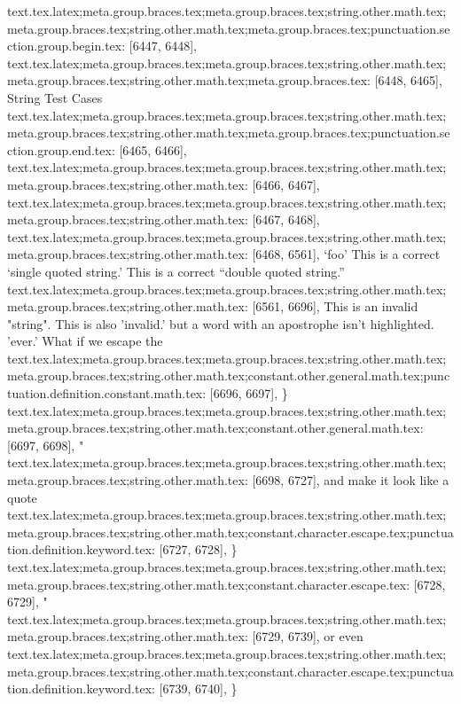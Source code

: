 {{{{{{{{{{{{{{{{{{{{{{{{{{{{{{{{{{{{{{{{{{{{{{{{{{{{{{{{{{{{{{{{{{{{{{{{{{{{{{{{{{{{{{{{{{{{{{{{{{{{{{{{{{{{{{{{{{{{{{{{{{{{{{{{{{{{{{{{{{{{{{{{{{{{{{{{{{{{{{{{{{{{{{{{{{{{{{{{{{{{{text.tex.latex;meta.group.braces.tex;meta.group.braces.tex;string.other.math.tex;meta.group.braces.tex;string.other.math.tex;meta.group.braces.tex;punctuation.section.group.begin.tex: [6447, 6448], {{}
text.tex.latex;meta.group.braces.tex;meta.group.braces.tex;string.other.math.tex;meta.group.braces.tex;string.other.math.tex;meta.group.braces.tex: [6448, 6465], {String Test Cases}
text.tex.latex;meta.group.braces.tex;meta.group.braces.tex;string.other.math.tex;meta.group.braces.tex;string.other.math.tex;meta.group.braces.tex;punctuation.section.group.end.tex: [6465, 6466], {}}
text.tex.latex;meta.group.braces.tex;meta.group.braces.tex;string.other.math.tex;meta.group.braces.tex;string.other.math.tex: [6466, 6467], {
}
text.tex.latex;meta.group.braces.tex;meta.group.braces.tex;string.other.math.tex;meta.group.braces.tex;string.other.math.tex: [6467, 6468], {
}
text.tex.latex;meta.group.braces.tex;meta.group.braces.tex;string.other.math.tex;meta.group.braces.tex;string.other.math.tex: [6468, 6561], {`foo' This is a correct `single quoted string.'  This is a correct ``double quoted string.''
}
text.tex.latex;meta.group.braces.tex;meta.group.braces.tex;string.other.math.tex;meta.group.braces.tex;string.other.math.tex: [6561, 6696], {This is an invalid "string".  This is also 'invalid.'  but a word with an apostrophe isn't highlighted. 'ever.'  What if we escape the }
text.tex.latex;meta.group.braces.tex;meta.group.braces.tex;string.other.math.tex;meta.group.braces.tex;string.other.math.tex;constant.other.general.math.tex;punctuation.definition.constant.math.tex: [6696, 6697], {\}
text.tex.latex;meta.group.braces.tex;meta.group.braces.tex;string.other.math.tex;meta.group.braces.tex;string.other.math.tex;constant.other.general.math.tex: [6697, 6698], {"}
text.tex.latex;meta.group.braces.tex;meta.group.braces.tex;string.other.math.tex;meta.group.braces.tex;string.other.math.tex: [6698, 6727], {and make it look like a quote}
text.tex.latex;meta.group.braces.tex;meta.group.braces.tex;string.other.math.tex;meta.group.braces.tex;string.other.math.tex;constant.character.escape.tex;punctuation.definition.keyword.tex: [6727, 6728], {\}
text.tex.latex;meta.group.braces.tex;meta.group.braces.tex;string.other.math.tex;meta.group.braces.tex;string.other.math.tex;constant.character.escape.tex: [6728, 6729], {"}
text.tex.latex;meta.group.braces.tex;meta.group.braces.tex;string.other.math.tex;meta.group.braces.tex;string.other.math.tex: [6729, 6739], {  or even }
text.tex.latex;meta.group.braces.tex;meta.group.braces.tex;string.other.math.tex;meta.group.braces.tex;string.other.math.tex;constant.character.escape.tex;punctuation.definition.keyword.tex: [6739, 6740], {\}
}}}}}}}}}}}}}}}}}}}}}}}}}}}}}}}}}}}}}}}}}}}}}}}}}}}}}}}}}}}}}}}}}}}}}}}}}}}}}}}}}}}}}}}}}}}}}}}}}}}}}}}}}}}}}}}}}}}}}}}}}}}}}}}}}}}}}}}}}}}}}}}}}}}}}}}}}}}}}}}}}}}}}}}}}}}}}}}}}}}}}}}}
